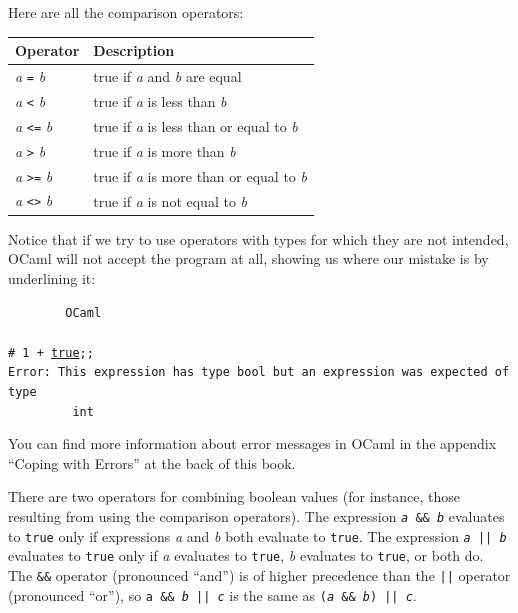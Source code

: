 \documentclass[]{book}
\newcommand{\smspace}{\vspace{4mm}}
\begin{document}
\noindent Here are all the comparison operators:

\smspace
\noindent\begin{tabular}{@{}ll@{}} \toprule
Operator & Description\\
\midrule
\index{=@\texttt{=}}\textit{a} \texttt{=} \textit{b} & true if \textit{a} and \textit{b} are equal\\
\index{<@\texttt{<}}\textit{a} \texttt{<} \textit{b} & true if \textit{a} is less than \textit{b}\\
\index{<=@\texttt{<=}}\textit{a} \texttt{<=} \textit{b} & true if \textit{a} is less than or equal to \textit{b}\\
\index{>@\texttt{>}}\textit{a} \texttt{>} \textit{b} & true if \textit{a} is more than \textit{b}\\
\index{>=@\texttt{>=}}\textit{a} \texttt{>=} \textit{b} & true if \textit{a} is more than or equal to \textit{b}\\
\index{<>@\texttt{<>}}\textit{a} \texttt{<>} \textit{b} & true if \textit{a} is not equal to \textit{b}\\ \bottomrule
\end{tabular}
\smspace

\noindent Notice that if we try to use operators with types for which they are not intended, OCaml will not accept the program at all, showing us where our mistake is by underlining it:

\smspace
\noindent\verb!        OCaml!\\
\noindent\\
\noindent\texttt{\# 1 + }\underline{\verb!true!}\texttt{;;}\\
\noindent\texttt{Error:\ This expression has type bool but an expression was expected of type}\\
\noindent\verb!         int!
\smspace

\noindent You can find more information about error messages in OCaml in the appendix ``Coping with Errors'' at the back of this book.

\newcommand{\doublebar}{||}

There are two operators for combining boolean values (for instance, those resulting from using the comparison operators). The expression \texttt{\textit{\textrm{a}} \&\& \textit{\textrm{b}}} evaluates to \texttt{true} only if expressions \textit{a} and \textit{b} both evaluate to \texttt{true}. The expression \index{\doublebar@\texttt{\doublebar}}\texttt{\textit{\textrm{a}} || \textit{\textrm{b}}} evaluates to \texttt{true} only if \textit{a} evaluates to \texttt{true}, \textit{b} evaluates to \texttt{true}, or both do. The \texttt{\&\&} operator  (pronounced ``and'') is of higher precedence than the \texttt{||} operator (pronounced ``or''), so \texttt{\textrm{\textup{a}} \&\& \textit{\textrm{b}} || \textrm{\textit{c}}} is the same as \texttt{(\textit{\textrm{a}} \&\& \textit{\textrm{b}}) || \textrm{\textit{c}}}.
\end{document}
